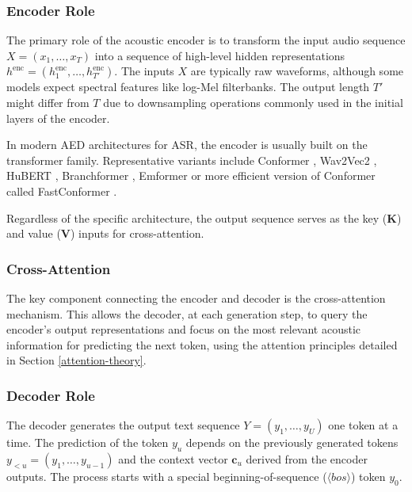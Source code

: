 \subsubsection{Encoder Role}

The primary role of the acoustic encoder is to transform the input audio sequence $X = (x_1, \dots, x_T)$ into a sequence of high-level hidden representations $h^{\text{enc}} = (h^{\text{enc}}_1, \dots, h^{\text{enc}}_{T'})$. The inputs $X$ are typically raw waveforms, although some models expect spectral features like log-Mel filterbanks. The output length $T'$ might differ from $T$ due to downsampling operations commonly used in the initial layers of the encoder.

In modern AED architectures for ASR, the encoder is usually built on the transformer family. Representative variants include Conformer \cite{gulati2020conformer}, Wav2Vec2 \cite{baevski2020wav2vec20frameworkselfsupervised}, HuBERT \cite{Hsu_2021}, Branchformer \cite{peng2022branchformer}, Emformer \cite{shi_2021} or more efficient version of Conformer called FastConformer \cite{Rekesh_2023}.

Regardless of the specific architecture, the output sequence serves as the key ($\mathbf{K}$) and value ($\mathbf{V}$) inputs for cross-attention.

\subsubsection{Cross-Attention}

The key component connecting the encoder and decoder is the cross-attention mechanism. This allows the decoder, at each generation step, to query the encoder's output representations and focus on the most relevant acoustic information for predicting the next token, using the attention principles detailed in Section \ref{attention-theory}.

\subsubsection{Decoder Role}

The decoder generates the output text sequence $Y = (y_1, \dots, y_U)$ one token at a time. The prediction of the token $y_u$ depends on the previously generated tokens $y_{<u} = (y_1, \dots, y_{u-1})$ and the context vector $\mathbf{c}_u$ derived from the encoder outputs. The process starts with a special beginning-of-sequence ($\langle bos \rangle$) token $y_0$.

